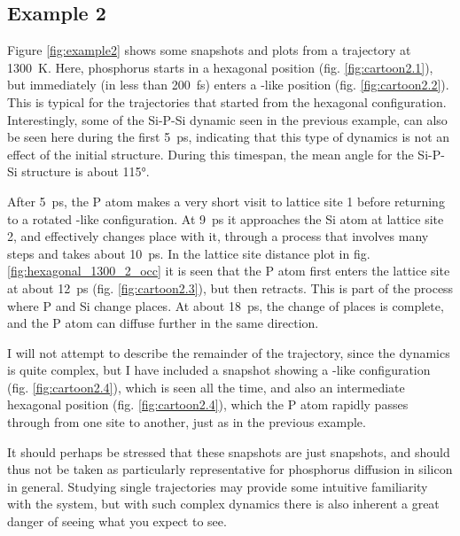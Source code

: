 \documentclass[11pt,bibliography=totoc,index=totoc]{scrbook}   %
\begin{document}


%
\subsection{Example 2}
%

Figure \ref{fig:example2} shows some snapshots and plots from a trajectory at 1300~K.
Here, phosphorus starts in a hexagonal position (fig. \ref{fig:cartoon2.1}), 
but immediately (in less than 200~fs) enters a -like position (fig. \ref{fig:cartoon2.2}).
This is typical for the trajectories that started from the hexagonal configuration.
Interestingly, some of the Si-P-Si dynamic seen in the previous example, can also be seen here during the first 5~ps, indicating
that this type of dynamics is not an effect of the initial structure. 
During this timespan, the mean angle for the Si-P-Si structure is about \ang{115}.

After 5~ps, the P atom makes a very short visit to lattice site 1 before returning to a rotated -like configuration.
At 9~ps it approaches the Si atom at lattice site 2, and effectively changes place with it, 
through a process that involves many steps and takes about 10~ps.
In the lattice site distance plot in fig. \ref{fig:hexagonal_1300_2_occ} it is seen that the P atom first enters the lattice site at about 12~ps
(fig. \ref{fig:cartoon2.3}), but 
then retracts. This is part of the process where P and Si change places.
At about 18~ps, the change of places is complete, and the P atom can diffuse further in the same direction.

I will not attempt to describe the remainder of the trajectory, since the dynamics is quite complex,  
but I have included a snapshot showing a -like configuration (fig. \ref{fig:cartoon2.4}), which is seen all the time, 
and also an intermediate hexagonal position (fig. \ref{fig:cartoon2.4}), 
which the P atom rapidly passes through from one site to another, just as in the previous example.

It should perhaps be stressed that these snapshots are just snapshots, 
and should thus not be taken as particularly representative for phosphorus diffusion in silicon in general.
Studying single trajectories may provide some intuitive familiarity with the system, 
but with such complex dynamics there is also inherent a great danger of seeing what you expect to see.
\end{document}
